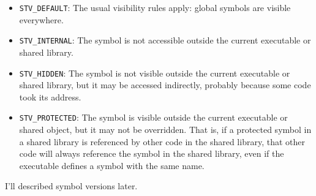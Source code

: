 \begin{itemize}
    \item \texttt{STV\_DEFAULT}: The usual visibility rules apply: global symbols
          are visible everywhere.

    \item \texttt{STV\_INTERNAL}: The symbol is not accessible outside the current
          executable or shared library.

    \item \texttt{STV\_HIDDEN}: The symbol is not visible outside the current
          executable or shared library, but it may be accessed indirectly,
          probably because some code took its address.

    \item \texttt{STV\_PROTECTED}: The symbol is visible outside the current
          executable or shared object, but it may not be overridden. That is,
          if a protected symbol in a shared library is referenced by other code
          in the shared library, that other code will always reference the
          symbol in the shared library, even if the executable defines a symbol
          with the same name.
\end{itemize}

I'll described symbol versions later.
